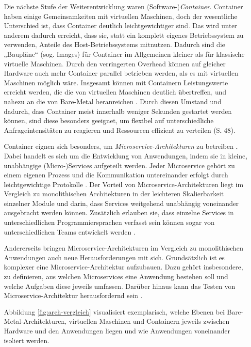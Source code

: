 \documentclass[11pt,a4paper]{article}
\begin{document}
Die nächste Stufe der Weiterentwicklung waren (Software-)\emph{Container}. Container haben einige Gemeinsamkeiten mit virtuellen Maschinen, doch der wesentliche Unterschied ist,
dass Container deutlich leichtgewichtiger sind. Das wird unter anderem dadurch erreicht, dass sie, statt ein komplett eigenes Betriebssystem zu verwenden,
Anteile des Host-Betriebssystems mitnutzen. Dadurch sind die „Baupläne“ (sog. Images) für Container im Allgemeinen kleiner als für klassische virtuelle Maschinen.
Durch den verringerten Overhead können auf gleicher Hardware auch mehr Container parallel betrieben werden, als es mit virtuellen Maschinen möglich wäre.
Insgesamt können mit Containern Leistungswerte erreicht werden, die die von virtuellen Maschinen deutlich übertreffen,
und nahezu an die von Bare-Metal heranreichen \cite{1272998.1273025}.
Durch diesen Umstand und dadurch, dass Container meist innerhalb weniger Sekunden gestartet werden können, sind diese besonders geeignet,
um flexibel auf unterschiedliche Anfrageintensitäten zu reagieren und Ressourcen effizient zu verteilen \cite{kofler2021docker} (S. 48).

Container eignen sich besonders, um \emph{Microservice-Architekturen} zu betreiben \cite{7158965}. Dabei handelt es sich um die
Entwicklung von Anwendungen, indem sie in kleine, unabhängige (Micro-)Services aufgeteilt werden. Jeder Microservice gehört zu
einem eigenen Prozess und die Kommunikation untereinander erfolgt durch leichtgewichtige Protokolle \cite{8406008}.
Der Vorteil von Microservice-Architekturen liegt im Vergleich zu monolithischen Architekturen in der
leichteren Skalierbarkeit einzelner Module und darin, dass Services weitgehend unabhängig voneinander
ausgebracht werden können. Zusätzlich erlauben sie, dass einzelne Services in unterschiedlichen Programmiersprachen
verfasst sein können sogar von unterschiedlichen Teams entwickelt werden \cite{microservices}.

Andererseits bringen Microservice-Architekturen im Vergleich zu monolithischen Anwendungen
auch neue Herausforderungen mit sich.
Grundsätzlich ist es komplexer eine Microservice-Architektur aufzubauen.
Dazu gehört insbesondere, zu definieren, aus welchen Microservices eine Anwendung bestehen soll
und welche Aufgaben diese jeweils umfassen. Darüber hinaus kann das Testen von Microservice-Architektur
herausfordernd sein \cite{8406008}.

Abbildung \ref{fig:arch-vergleich} visualisiert exemplarisch, welche Ebenen bei Bare-Metal-Architekturen, virtuellen Maschinen und Containern
jeweils zwischen Hardware und den Anwendungen liegen und wie Anwendungen voneinander isoliert werden.
\end{document}
